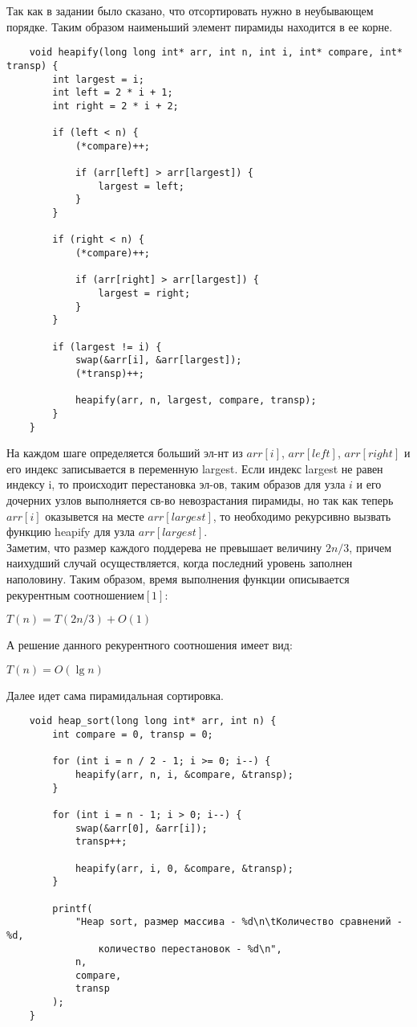 \documentclass[a4paper,12pt,titlepage,finall]{article}
\begin{document}
Так как в задании было сказано, что отсортировать нужно в неубывающем порядке.
Таким образом наименьший элемент пирамиды находится в ее корне.

\begin{verbatim}
    void heapify(long long int* arr, int n, int i, int* compare, int* transp) {
        int largest = i;
        int left = 2 * i + 1;
        int right = 2 * i + 2;

        if (left < n) {
            (*compare)++;

            if (arr[left] > arr[largest]) {
                largest = left;
            }
        }

        if (right < n) {
            (*compare)++;

            if (arr[right] > arr[largest]) {
                largest = right;
            }
        }

        if (largest != i) {
            swap(&arr[i], &arr[largest]);
            (*transp)++;

            heapify(arr, n, largest, compare, transp);
        }
    }    
\end{verbatim}

На каждом шаге определяется больший эл-нт из $arr[i]$, $arr[left]$, $arr[right]$ и его
индекс записывается в переменную largest. Если индекс largest не равен
индексу i, то происходит перестановка эл-ов, таким образов для 
узла $i$ и его дочерних узлов выполняется св-во невозрастания пирамиды, но так как 
теперь $arr[i]$ оказывется на месте $arr[largest]$, то необходимо
рекурсивно вызвать функцию heapify для узла $arr[largest]$.
\\
Заметим, что размер каждого поддерева не превышает величину $2n/3$, причем наихудший
случай осуществляется, когда последний уровень заполнен наполовину. Таким образом,
время выполнения функции описывается рекурентным соотношением$[1]$: 
\begin{center}
    $T(n) = T(2n/3) + O(1)$
\end{center}

А решение данного рекурентного соотношения имеет вид:
\begin{center}
    $T(n) = O(\lg n)$
\end{center}

Далее идет сама пирамидальная сортировка.

\begin{verbatim}
    void heap_sort(long long int* arr, int n) {
        int compare = 0, transp = 0;

        for (int i = n / 2 - 1; i >= 0; i--) {
            heapify(arr, n, i, &compare, &transp);
        }

        for (int i = n - 1; i > 0; i--) {
            swap(&arr[0], &arr[i]);
            transp++;

            heapify(arr, i, 0, &compare, &transp);
        }

        printf(
            "Heap sort, размер массива - %d\n\tКоличество сравнений - %d,
                количество перестановок - %d\n",
            n,
            compare,
            transp
        );
    }
\end{verbatim}
\end{document}
